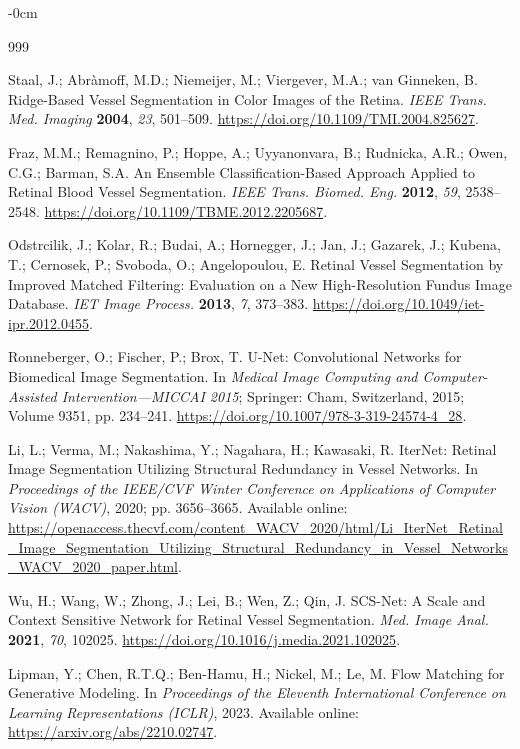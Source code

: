 \documentclass[jimaging,article,submit,pdftex,moreauthors]{Definitions/mdpi}
\begin{document}
\begin{adjustwidth}{-\extralength}{0cm}
\begin{thebibliography}{999}

Staal, J.; Abr\`amoff, M.D.; Niemeijer, M.; Viergever, M.A.; van Ginneken, B.
Ridge-Based Vessel Segmentation in Color Images of the Retina.
\textit{IEEE Trans. Med. Imaging} \textbf{2004}, \textit{23}, 501--509.
\url{https://doi.org/10.1109/TMI.2004.825627}.

Fraz, M.M.; Remagnino, P.; Hoppe, A.; Uyyanonvara, B.; Rudnicka, A.R.; Owen, C.G.; Barman, S.A.
An Ensemble Classification-Based Approach Applied to Retinal Blood Vessel Segmentation.
\textit{IEEE Trans. Biomed. Eng.} \textbf{2012}, \textit{59}, 2538--2548.
\url{https://doi.org/10.1109/TBME.2012.2205687}.

Odstrcilik, J.; Kolar, R.; Budai, A.; Hornegger, J.; Jan, J.; Gazarek, J.; Kubena, T.; Cernosek, P.; Svoboda, O.; Angelopoulou, E.
Retinal Vessel Segmentation by Improved Matched Filtering: Evaluation on a New High-Resolution Fundus Image Database.
\textit{IET Image Process.} \textbf{2013}, \textit{7}, 373--383.
\url{https://doi.org/10.1049/iet-ipr.2012.0455}.

Ronneberger, O.; Fischer, P.; Brox, T.
U-Net: Convolutional Networks for Biomedical Image Segmentation.
In \textit{Medical Image Computing and Computer-Assisted Intervention---MICCAI 2015};
Springer: Cham, Switzerland, 2015; Volume 9351, pp. 234--241.
\url{https://doi.org/10.1007/978-3-319-24574-4_28}.

Li, L.; Verma, M.; Nakashima, Y.; Nagahara, H.; Kawasaki, R.
IterNet: Retinal Image Segmentation Utilizing Structural Redundancy in Vessel Networks.
In \textit{Proceedings of the IEEE/CVF Winter Conference on Applications of Computer Vision (WACV)}, 2020; pp. 3656--3665.
Available online: \url{https://openaccess.thecvf.com/content_WACV_2020/html/Li_IterNet_Retinal_Image_Segmentation_Utilizing_Structural_Redundancy_in_Vessel_Networks_WACV_2020_paper.html}.

Wu, H.; Wang, W.; Zhong, J.; Lei, B.; Wen, Z.; Qin, J.
SCS-Net: A Scale and Context Sensitive Network for Retinal Vessel Segmentation.
\textit{Med. Image Anal.} \textbf{2021}, \textit{70}, 102025.
\url{https://doi.org/10.1016/j.media.2021.102025}.

Lipman, Y.; Chen, R.T.Q.; Ben-Hamu, H.; Nickel, M.; Le, M.
Flow Matching for Generative Modeling.
In \textit{Proceedings of the Eleventh International Conference on Learning Representations (ICLR)}, 2023.
Available online: \url{https://arxiv.org/abs/2210.02747}.


\end{thebibliography}
\end{adjustwidth}
\end{document}
